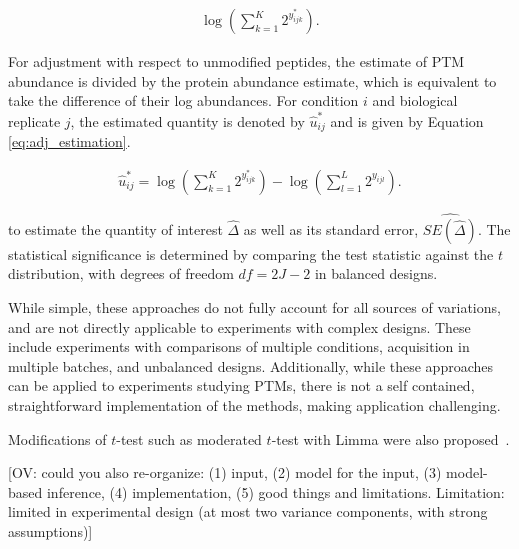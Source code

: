 \documentclass[mcp]{article}
\numberwithin{table}{section}
\def\todo#1{{\color{red}[#1]}}
\begin{document}
\begin{equation}
\begin{aligned}
\log \left( \sum_{k=1}^{K} 2^{y_{ijk}^{\ast}} \right).
\end{aligned}
\label{eq:feature_estimation}
\end{equation}

For adjustment with respect to unmodified peptides, the estimate of PTM abundance is divided by the protein abundance estimate, which is equivalent to take the difference of their log abundances. For condition $i$ and biological replicate $j$, the estimated quantity is denoted by $\hat{u}^{\ast}_{ij}$ and is given by Equation \ref{eq:adj_estimation}.

\begin{equation}
\begin{aligned}
\hat{u}^{\ast}_{ij} = \log \left( \sum_{k=1}^{K} 2^{y_{ijk}^{\ast}} \right) - \log \left( \sum_{l=1}^{L} 2^{y_{ijl}} \right).
\end{aligned}
\label{eq:adj_estimation}
\end{equation}


to estimate the quantity of interest $\hat{\Delta}$ as well as its standard error, $\widehat{SE(\hat{\Delta})}$.  The statistical significance is determined by comparing the test statistic against the $t$ distribution, with degrees of freedom $df=2J-2$ in balanced designs.

While simple, these approaches do not fully account for all sources of variations, and are not directly applicable to experiments with complex designs. These include experiments with comparisons of multiple conditions, acquisition in multiple batches, and unbalanced designs. Additionally, while these approaches can be applied to experiments studying PTMs, there is not a self contained, straightforward implementation of the methods, making application challenging.

\medskip {} Modifications of $t$-test such as moderated $t$-test with Limma were also proposed~\cite{Ritchie_15a}\cite{Zhu}. 

\todo{OV: could you also re-organize: (1) input, (2) model for the input, (3) model-based inference, (4) implementation, (5) good things and limitations. Limitation: limited in experimental design (at most two variance components, with strong assumptions)}
\end{document}
